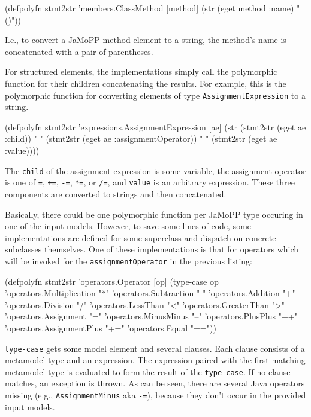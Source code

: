 \documentclass[11pt]{article}
\begin{document}
\begin{clojurecode}
(defpolyfn stmt2str 'members.ClassMethod
  [method]
  (str (eget method :name) "()"))
\end{clojurecode}

I.e., to convert a JaMoPP method element to a string, the method's name is
concatenated with a pair of parentheses.

For structured elements, the implementations simply call the polymorphic
function for their children concatenating the results.  For example, this is
the polymorphic function for converting elements of type
\verb|AssignmentExpression| to a string.

\begin{clojurecode}
(defpolyfn stmt2str 'expressions.AssignmentExpression
  [ae]
  (str (stmt2str (eget ae :child)) " "
       (stmt2str (eget ae :assignmentOperator)) " "
       (stmt2str (eget ae :value))))
\end{clojurecode}

The \verb|child| of the assignment expression is some variable, the assignment
operator is one of \verb|=|, \verb|+=|, \verb|-=|, \verb|*=|, or \verb|/=|, and
\verb|value| is an arbitrary expression.  These three components are converted
to strings and then concatenated.

Basically, there could be one polymorphic function per JaMoPP type occuring in
one of the input models.  However, to save some lines of code, some
implementations are defined for some superclass and dispatch on concrete
subclasses themselves.  One of these implementations is that for operators
which will be invoked for the \verb|assignmentOperator| in the previous
listing:

\begin{clojurecode}
(defpolyfn stmt2str 'operators.Operator
  [op]
  (type-case op
    'operators.Multiplication "*"
    'operators.Subtraction    "-"
    'operators.Addition       "+"
    'operators.Division       "/"
    'operators.LessThan       "<"
    'operators.GreaterThan    ">"
    'operators.Assignment     "="
    'operators.MinusMinus     "--"
    'operators.PlusPlus       "++"
    'operators.AssignmentPlus "+="
    'operators.Equal          "=="))
\end{clojurecode}

\verb|type-case| gets some model element and several clauses.  Each clause
consists of a metamodel type and an expression.  The expression paired with the
first matching metamodel type is evaluated to form the result of the
\verb|type-case|.  If no clause matches, an exception is thrown.  As can be
seen, there are several Java operators missing (e.g., \verb|AssignmentMinus|
aka \verb|-=|), because they don't occur in the provided input models.
\end{document}
